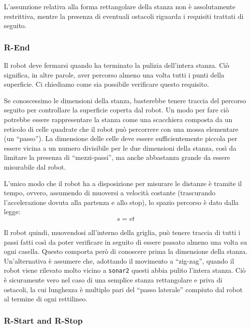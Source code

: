 \documentclass{../llncs}
\newcommand{\code}[1]{{\color{blue}\small{\texttt{#1}}}}
\begin{document}
L'assunzione relativa alla forma rettangolare della stanza non è assolutamente restrittiva, mentre la presenza di eventuali ostacoli riguarda i requisiti trattati di seguito.

\subsubsection{R-End}
Il robot deve fermarsi quando ha terminato la pulizia dell'intera stanza. Ciò significa, in altre parole, aver percorso almeno una volta tutti i punti della superficie. Ci chiediamo come sia possibile verificare questo requisito.

Se conoscessimo le dimensioni della stanza, basterebbe tenere traccia del percorso seguito per controllare la superficie coperta dal robot. Un modo per fare ciò potrebbe essere rappresentare la stanza come una scacchiera composta da un reticolo di celle quadrate che il robot può percorrere con una mossa elementare (un ``passo''). La dimensione delle celle deve essere sufficientemente piccola per essere vicina a un numero divisibile per le due dimensioni della stanza, così da limitare la presenza di ``mezzi-passi'', ma anche abbastanza grande da essere misurabile dal robot.

L'unico modo che il robot ha a disposizione per misurare le distanze è tramite il tempo, ovvero, assumendo di muoversi a velocità costante (trascurando l'accelerazione dovuta alla partenza e allo stop), lo spazio percorso è dato dalla legge:
\[s = v t \]

Il robot quindi, muovendosi all'interno della griglia, può tenere traccia di tutti i passi fatti così da poter verificare in seguito di essere passato almeno una volta su ogni casella. Questo comporta però di conoscere prima la dimensione della stanza.\\

Un'alternativa è assumere che, adottando il movimento a ``zig-zag'', quando il robot viene rilevato molto vicino a \code{sonar2} questi abbia pulito l'intera stanza. Ciò è sicuramente vero nel caso di una semplice stanza rettangolare e priva di ostacoli, la cui lunghezza è multiplo pari del ``passo laterale'' compiuto dal robot al termine di ogni rettilineo.

\subsubsection{R-Start and R-Stop}

\end{document}
